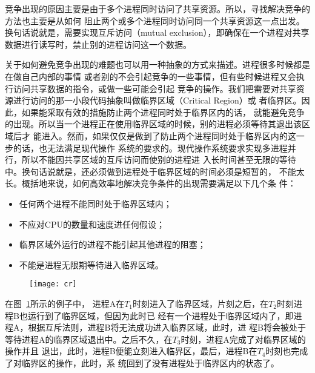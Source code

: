 \documentclass{swfuthesism}
\begin{document}
竞争出现的原因主要是由于多个进程同时访问了共享资源。所以，寻找解决竞争的方法也主要是从如何
阻止两个或多个进程同时访问同一个共享资源这一点出发。换句话说就是，需要实现互斥访问（mutual
exclusion），即确保在一个进程对共享数据进行读写时，禁止别的进程访问这一个数据。

关于如何避免竞争出现的难题也可以用一种抽象的方式来描述。进程很多时候都是在做自己内部的事情
或者别的不会引起竞争的一些事情，但有些时候进程又会执行访问共享数据的指令，或做一些可能会引起
竞争的操作。我们把需要对共享资源进行访问的那一小段代码抽象叫做临界区域（Critical Region）或
者临界区\cite{Raynal12}。因此，如果能采取有效的措施防止两个进程同时处于临界区内的话，
就能避免竞争的出现。所以当一个进程正在使用临界区域的时候，别的进程必须等待其退出该区域后才
能进入。然而，如果仅仅是做到了防止两个进程同时处于临界区内的这一步的话，也无法满足现代操作
系统的要求的。现代操作系统要求实现多进程并行，所以不能因共享区域的互斥访问而使别的进程进
入长时间甚至无限的等待中。换句话说就是，还必须做到进程处于临界区域的时间必须是短暂的，
不能太长。概括地来说，如何高效率地解决竞争条件的出现需要满足以下几个条
件\cite{Jonhesmt08}：
\begin{itemize}
\item 任何两个进程不能同时处于临界区域内；
\item 不应对CPU的数量和速度进任何假设；
\item 临界区域外运行的进程不能引起其他进程的阻塞；
\item 不能是进程无限期等待进入临界区域。
\end{itemize}

\begin{figure}[ht]
  \centering
  \texttt{[image: cr]}
  \label{fig:critical}
\end{figure}

在图~\ref{fig:critical}\cite{tanenbaum2008modern}所示的例子中，
进程A在$T_1$时刻进入了临界区域，片刻之后，在$T_2$时刻进程B也运行到了临界区域，但因为此时已
经有一个进程处于临界区域内了，即进程A，根据互斥法则，进程B将无法成功进入临界区域，此时，进
程B将会被处于等待进程A的临界区域退出中。之后不久，在$T_3$时刻，进程A完成了对临界区域的操作并且
退出，此时，进程B便能立刻进入临界区，最后，进程B在$T_4$时刻也完成了对临界区的操作，此时，系
统回到了没有进程处于临界区内的状态了。

\end{document}
